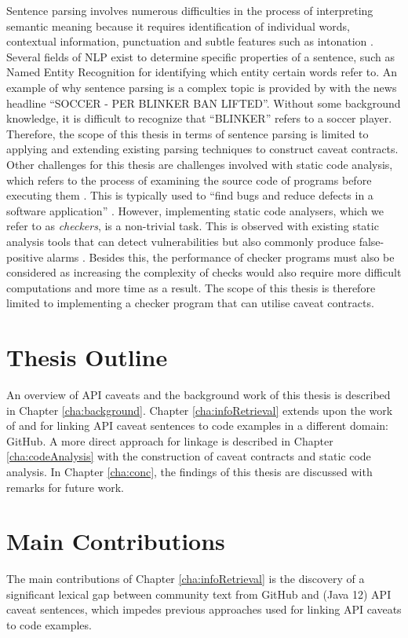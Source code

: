 Sentence parsing involves numerous difficulties in the process of interpreting semantic meaning because it requires identification of individual words, contextual information, punctuation and subtle features such as intonation \cite{mitchell1994sentence}. Several fields of NLP exist to determine specific properties of a sentence, such as Named Entity Recognition for identifying which entity certain words refer to. An example of why sentence parsing is a complex topic is provided by \cite{ratinov-roth-2009-design} with the news headline ``SOCCER - PER BLINKER BAN LIFTED''. Without some background knowledge, it is difficult to recognize that ``BLINKER'' refers to a soccer player.  Therefore, the scope of this thesis in terms of sentence parsing is limited to applying and extending existing parsing techniques to construct caveat contracts. \\
Other challenges for this thesis are challenges involved with static code analysis, which refers to the process of examining the source code of programs before executing them \cite{baca2009static}. This is typically used to ``find bugs and reduce defects in a software application'' \cite{bardas2010static}. However, implementing static code analysers, which we refer to as \textit{checkers}, is a non-trivial task. This is observed with existing static analysis tools that can detect vulnerabilities but also commonly produce false-positive alarms \cite{zitser2004testing}. Besides this, the performance of checker programs must also be considered as increasing the complexity of checks would also require more difficult computations and more time as a result. The scope of this thesis is therefore limited to implementing a checker program that can utilise caveat contracts. 

\section{Thesis Outline}
\label{sec:outline}
An overview of API caveats and the background work of this thesis is described in Chapter \ref{cha:background}. Chapter \ref{cha:infoRetrieval} extends upon the work of \cite{jiamou} and \cite{xiaoxue} for linking API caveat sentences to code examples in a different domain: GitHub. A more direct approach for linkage is described in Chapter \ref{cha:codeAnalysis} with the construction of caveat contracts and static code analysis. In Chapter \ref{cha:conc}, the findings of this thesis are discussed with remarks for future work.

\section{Main Contributions}
The main contributions of Chapter \ref{cha:infoRetrieval} is the discovery of a significant lexical gap between community text from GitHub and (Java 12) API caveat sentences, which impedes previous approaches used for linking API caveats to code examples.\\

